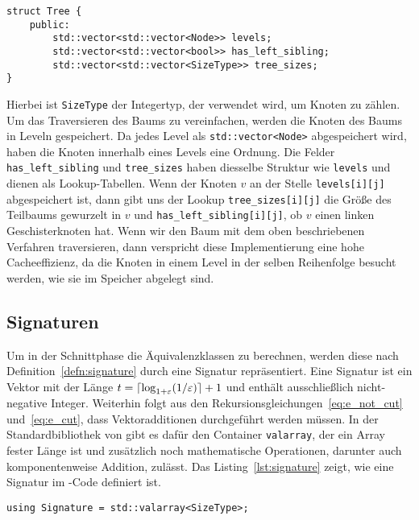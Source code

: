 \begin{lstlisting}[caption={Definition von \texttt{struct Tree}}, label={lst:structtree}]
struct Tree {
    public:
        std::vector<std::vector<Node>> levels;
        std::vector<std::vector<bool>> has_left_sibling;
        std::vector<std::vector<SizeType>> tree_sizes;
}
\end{lstlisting}
 Hierbei ist \texttt{SizeType} der Integertyp, der verwendet wird, um Knoten zu zählen.
Um das Traversieren des Baums zu vereinfachen, werden die Knoten des Baums in Leveln gespeichert.
Da jedes Level als \texttt{std::vector<Node>} abgespeichert wird, haben die Knoten innerhalb eines Levels eine Ordnung.
Die Felder \texttt{has\_left\_sibling} und \texttt{tree\_sizes} haben diesselbe Struktur wie \texttt{levels} und dienen als Lookup-Tabellen.
Wenn der Knoten $v$ an der Stelle \texttt{levels[i][j]} abgespeichert ist, dann gibt uns der Lookup \texttt{tree\_sizes[i][j]} die Größe des Teilbaums gewurzelt in $v$ und \texttt{has\_left\_sibling[i][j]}, ob $v$ einen linken Geschisterknoten hat.
Wenn wir den Baum mit dem oben beschriebenen Verfahren traversieren, dann verspricht diese Implementierung eine hohe Cacheeffizienz, da die Knoten in einem Level in der selben Reihenfolge besucht werden, wie sie im Speicher abgelegt sind.

\subsection{Signaturen}
Um in der Schnittphase die Äquivalenzklassen zu berechnen, werden diese nach Definition~\ref{defn:signature} durch eine Signatur repräsentiert.
Eine Signatur ist ein Vektor mit der Länge $t = \lceil\log_{1+\varepsilon}(1/\varepsilon)\rceil + 1$ und enthält ausschließlich nicht-negative Integer.
Weiterhin folgt aus den Rekursionsgleichungen~\eqref{eq:e_not_cut} und~\eqref{eq:e_cut}, dass Vektoradditionen durchgeführt werden müssen.
In der Standardbibliothek von \Cpp{} gibt es dafür den Container \texttt{valarray}, der ein Array fester Länge ist und zusätzlich noch mathematische Operationen, darunter auch komponentenweise Addition, zulässt. 
Das Listing~\ref{lst:signature} zeigt, wie eine Signatur im \Cpp\hyp Code definiert ist.
\begin{lstlisting}[caption={Definition von \texttt{Signature}}, label={lst:signature}]
using Signature = std::valarray<SizeType>;
\end{lstlisting}

